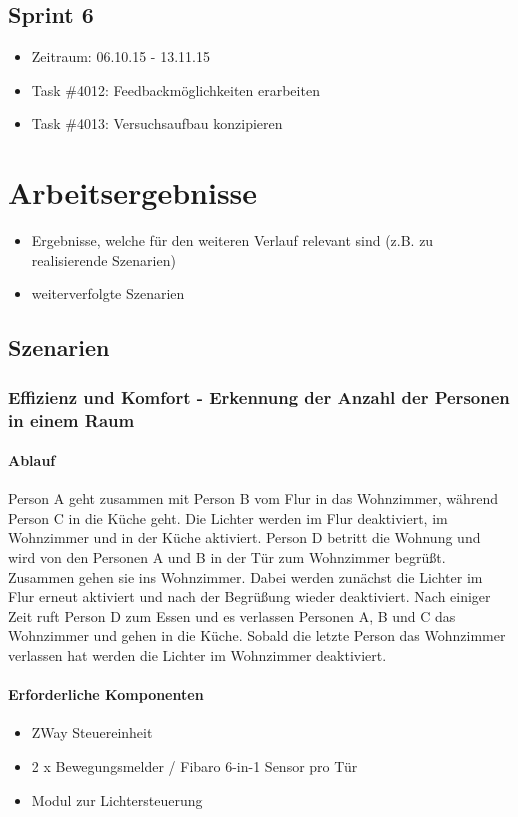 \documentclass[12pt, oneside, smallheadings]{scrbook}
\begin{document}
\section{Sprint 6}
\begin{itemize}
	\item Zeitraum: 06.10.15 - 13.11.15
	\item Task \#4012: Feedbackmöglichkeiten erarbeiten
	\item Task \#4013: Versuchsaufbau konzipieren
\end{itemize}

\chapter{Arbeitsergebnisse}
\begin{itemize}
	\item Ergebnisse, welche für den weiteren Verlauf relevant sind (z.B. zu realisierende Szenarien)
	\item weiterverfolgte Szenarien
\end{itemize}

\section{Szenarien}

\subsection{Effizienz und Komfort - Erkennung der Anzahl der Personen in einem Raum}
\subsubsection{Ablauf}
Person A geht zusammen mit Person B vom Flur in das Wohnzimmer, während Person C in die Küche geht.
Die Lichter werden im Flur deaktiviert, im Wohnzimmer und in der Küche aktiviert.
Person D betritt die Wohnung und wird von den Personen A und B in der Tür zum Wohnzimmer begrüßt. Zusammen gehen sie ins Wohnzimmer.
Dabei werden zunächst die Lichter im Flur erneut aktiviert und nach der Begrüßung wieder deaktiviert.
Nach einiger Zeit ruft Person D zum Essen und es verlassen Personen A, B und C das Wohnzimmer und gehen in die Küche.
Sobald die letzte Person das Wohnzimmer verlassen hat werden die Lichter im Wohnzimmer deaktiviert.

\subsubsection{Erforderliche Komponenten}
\begin{itemize}
	\item ZWay Steuereinheit
	\item 2 x Bewegungsmelder / Fibaro 6-in-1 Sensor pro Tür
	\item Modul zur Lichtersteuerung
\end{itemize}
\end{document}
